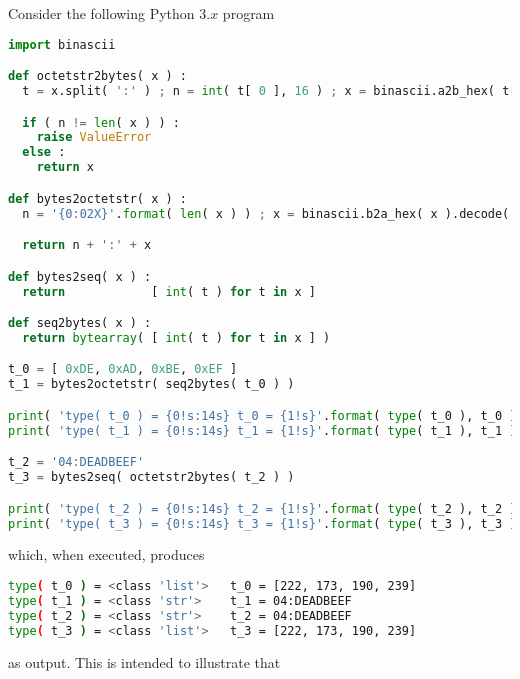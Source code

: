 %


Consider the following Python $3.x$ program

\begin{lstlisting}[language={Python},frame={single},basicstyle={\ttfamily\small}]
import binascii

def octetstr2bytes( x ) :
  t = x.split( ':' ) ; n = int( t[ 0 ], 16 ) ; x = binascii.a2b_hex( t[ 1 ] )

  if ( n != len( x ) ) :
    raise ValueError
  else :
    return x

def bytes2octetstr( x ) :
  n = '{0:02X}'.format( len( x ) ) ; x = binascii.b2a_hex( x ).decode( 'ascii' ).upper()

  return n + ':' + x

def bytes2seq( x ) :
  return            [ int( t ) for t in x ]

def seq2bytes( x ) :
  return bytearray( [ int( t ) for t in x ] )

t_0 = [ 0xDE, 0xAD, 0xBE, 0xEF ]
t_1 = bytes2octetstr( seq2bytes( t_0 ) )

print( 'type( t_0 ) = {0!s:14s} t_0 = {1!s}'.format( type( t_0 ), t_0 ) )
print( 'type( t_1 ) = {0!s:14s} t_1 = {1!s}'.format( type( t_1 ), t_1 ) )

t_2 = '04:DEADBEEF'
t_3 = bytes2seq( octetstr2bytes( t_2 ) )

print( 'type( t_2 ) = {0!s:14s} t_2 = {1!s}'.format( type( t_2 ), t_2 ) )
print( 'type( t_3 ) = {0!s:14s} t_3 = {1!s}'.format( type( t_3 ), t_3 ) )
\end{lstlisting}

\noindent
which, when executed, produces

\begin{lstlisting}[language={bash},  frame={single},basicstyle={\ttfamily\small}] 
type( t_0 ) = <class 'list'>   t_0 = [222, 173, 190, 239]
type( t_1 ) = <class 'str'>    t_1 = 04:DEADBEEF
type( t_2 ) = <class 'str'>    t_2 = 04:DEADBEEF
type( t_3 ) = <class 'list'>   t_3 = [222, 173, 190, 239]
\end{lstlisting}

\noindent
as output.  This is intended to illustrate that

